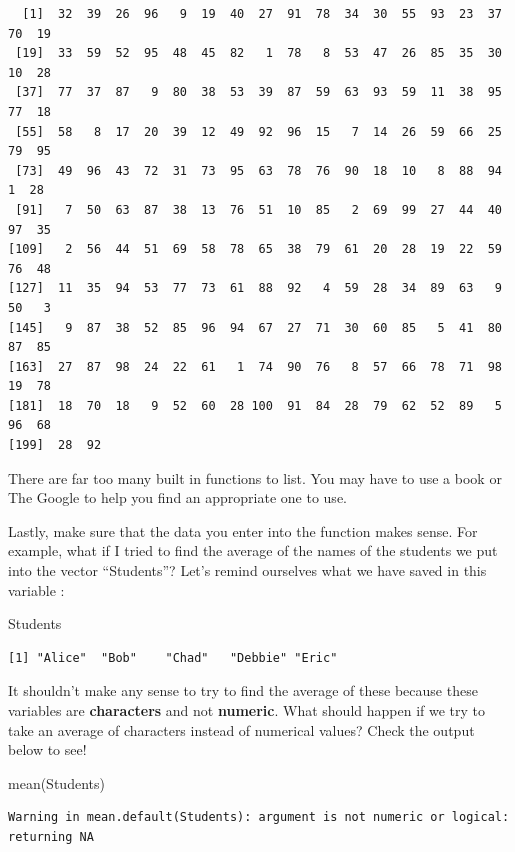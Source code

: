\documentclass[
  letterpaper,
  DIV=11,
  numbers=noendperiod]{scrreprt}
\newenvironment{Shaded}{\begin{snugshade}}{\end{snugshade}}
\newcommand{\FunctionTok}[1]{\textcolor[rgb]{0.28,0.35,0.67}{#1}}
\newcommand{\NormalTok}[1]{\textcolor[rgb]{0.00,0.23,0.31}{#1}}
\begin{document}
\begin{verbatim}
  [1]  32  39  26  96   9  19  40  27  91  78  34  30  55  93  23  37  70  19
 [19]  33  59  52  95  48  45  82   1  78   8  53  47  26  85  35  30  10  28
 [37]  77  37  87   9  80  38  53  39  87  59  63  93  59  11  38  95  77  18
 [55]  58   8  17  20  39  12  49  92  96  15   7  14  26  59  66  25  79  95
 [73]  49  96  43  72  31  73  95  63  78  76  90  18  10   8  88  94   1  28
 [91]   7  50  63  87  38  13  76  51  10  85   2  69  99  27  44  40  97  35
[109]   2  56  44  51  69  58  78  65  38  79  61  20  28  19  22  59  76  48
[127]  11  35  94  53  77  73  61  88  92   4  59  28  34  89  63   9  50   3
[145]   9  87  38  52  85  96  94  67  27  71  30  60  85   5  41  80  87  85
[163]  27  87  98  24  22  61   1  74  90  76   8  57  66  78  71  98  19  78
[181]  18  70  18   9  52  60  28 100  91  84  28  79  62  52  89   5  96  68
[199]  28  92
\end{verbatim}

There are far too many built in functions to list. You may have to use a
book or The Google to help you find an appropriate one to use.

Lastly, make sure that the data you enter into the function makes sense.
For example, what if I tried to find the average of the names of the
students we put into the vector ``Students''? Let's remind ourselves
what we have saved in this variable :

\begin{Shaded}
\begin{Highlighting}[]
\NormalTok{Students}
\end{Highlighting}
\end{Shaded}

\begin{verbatim}
[1] "Alice"  "Bob"    "Chad"   "Debbie" "Eric"  
\end{verbatim}

It shouldn't make any sense to try to find the average of these because
these variables are \textbf{characters} and not \textbf{numeric}. What
should happen if we try to take an average of characters instead of
numerical values? Check the output below to see!

\begin{Shaded}
\begin{Highlighting}[]
\FunctionTok{mean}\NormalTok{(Students)}
\end{Highlighting}
\end{Shaded}

\begin{verbatim}
Warning in mean.default(Students): argument is not numeric or logical:
returning NA
\end{verbatim}
\end{document}
